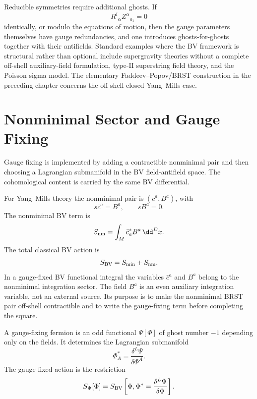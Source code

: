 \begin{remark}
Reducible symmetries require additional ghosts.  If
\[
  R^i{}_\alpha Z^\alpha{}_{a_1}=0
\]
identically, or modulo the equations of motion, then the gauge parameters
themselves have gauge redundancies, and one introduces ghosts-for-ghosts
together with their antifields.  Standard examples where the BV framework is
structural rather than optional include supergravity theories without a
complete off-shell auxiliary-field formulation, type-II superstring field
theory, and the Poisson sigma model.  The elementary Faddeev--Popov/BRST
construction in the preceding chapter concerns the off-shell closed
Yang--Mills case.
\end{remark}

\section{Nonminimal Sector and Gauge Fixing}

Gauge fixing is implemented by adding a contractible nonminimal pair and then
choosing a Lagrangian submanifold in the BV field-antifield space.  The
cohomological content is carried by the same BV differential.

For Yang--Mills theory the nonminimal pair is \((\bar c^a,B^a)\), with
\[
  s\bar c^a=B^a,\qquad sB^a=0.
\]
The nonminimal BV term is
\[
  S_{\rm nm}
  =
  \int_M \bar c^*_a B^a\,\dd^D x .
\]
The total classical BV action is
\[
  S_{\rm BV}=S_{\rm min}+S_{\rm nm}.
\]
In a gauge-fixed BV functional integral the variables \(\bar c^a\) and \(B^a\)
belong to the nonminimal integration sector.  The field \(B^a\) is an even
auxiliary integration variable, not an external source.  Its purpose is to
make the nonminimal BRST pair off-shell contractible and to write the
gauge-fixing term before completing the square.

\begin{definition}
A gauge-fixing fermion is an odd functional \(\Psi[\Phi]\) of ghost number
\(-1\) depending only on the fields.  It determines the Lagrangian
submanifold
\begin{equation}
  \Phi^*_A=\frac{\delta^L\Psi}{\delta\Phi^A}.
  \label{eq:gauge-fixing-lagrangian-submanifold}
\end{equation}
The gauge-fixed action is the restriction
\[
  S_\Psi[\Phi]
  =
  S_{\rm BV}\left[\Phi,\Phi^*=\frac{\delta^L\Psi}{\delta\Phi}\right].
\]
\end{definition}

